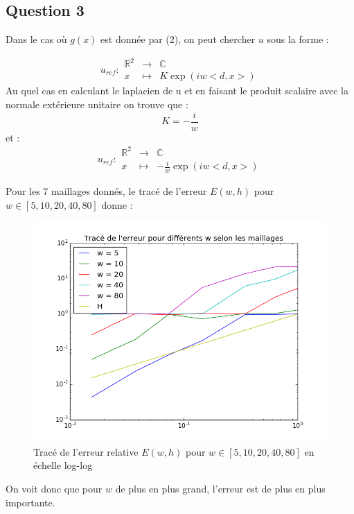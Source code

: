 \documentclass[a4paper,12pt]{article}
\begin{document}
	
\subsection{Question 3}

Dans le cas o\`u $g(x)$ est donnée par (2), on peut chercher $u$ sous la forme :

\[u_{ref}: \begin{array}{ccccc}
\mathbb{R}^{2} & \to & \mathbb{C}\\
x & \mapsto & K\exp(iw<d,x>)
\end{array}
\]
Au quel cas en calculant le laplacien de u et en faisant le produit scalaire avec la normale extérieure unitaire on trouve que :
\[K = -\frac{i}{w}\]
et : 
\[u_{ref}: \begin{array}{ccccc}
\mathbb{R}^{2} & \to & \mathbb{C}\\
x & \mapsto & -\frac{i}{w}\exp(iw<d,x>)
\end{array}
\]

\newpage

Pour les 7 maillages donnés, le tracé de l'erreur $E(w,h)$ pour $w \in [5, 10, 20, 40, 80]$ donne :


\begin{figure}[H]
\begin{center}
        \includegraphics[scale=0.8]{image/Erreur/figure_1}
\end{center}
\caption{Tracé de l'erreur relative $E(w,h)$ pour $w \in [5, 10, 20, 40, 80]$ en échelle log-log}
\end{figure}

On voit donc que pour $w$ de plus en plus grand, l'erreur est de plus en plus importante.
\end{document}
